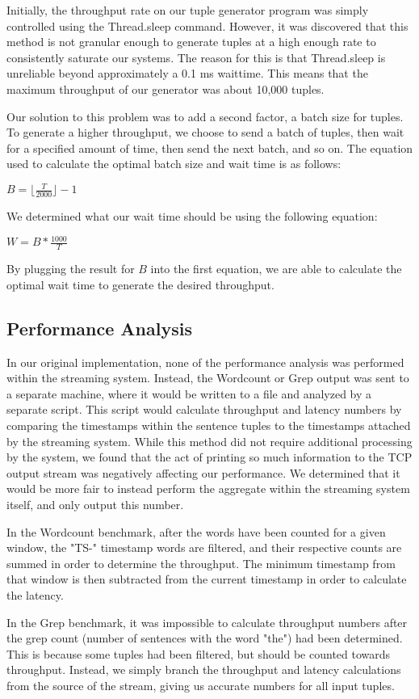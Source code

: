Initially, the throughput rate on our tuple generator program was simply controlled using the Thread.sleep command.  However, it was discovered that this method is not granular enough to generate tuples at a high enough rate to consistently saturate our systems.  The reason for this is that Thread.sleep is unreliable beyond approximately a 0.1 ms waittime.  This means that the maximum throughput of our generator was about 10,000 tuples.

Our solution to this problem was to add a second factor, a batch size for
tuples.  To generate a higher throughput, we choose to send a batch of tuples,
then wait for a specified amount of time, then send the next batch, and so on.
The equation used to calculate the optimal batch size and wait time is as follows:

{\large $B = \lfloor\frac{T}{2000}\rfloor - 1$}

We determined what our wait time should be using the following equation:

{\large $W = B * \frac{1000}{T}$}

By plugging the result for $B$ into the first equation, we are able to
calculate the optimal wait time to generate the desired throughput.

\subsection{Performance Analysis}
In our original implementation, none of the performance analysis was performed within the streaming system.  Instead, the Wordcount or Grep output was sent to a separate machine, where it would be written to a file and analyzed by a separate script.  This script would calculate throughput and latency numbers by comparing the timestamps within the sentence tuples to the timestamps attached by the streaming system.  While this method did not require additional processing by the system, we found that the act of printing so much information to the TCP output stream was negatively affecting our performance.  We determined that it would be more fair to instead perform the aggregate within the streaming system itself, and only output this number.

In the Wordcount benchmark, after the words have been counted for a given window, the "TS-" timestamp words are filtered, and their respective counts are summed in order to determine the throughput.  The minimum timestamp from that window is then subtracted from the current timestamp in order to calculate the latency.

In the Grep benchmark, it was impossible to calculate throughput numbers after the grep count (number of sentences with the word "the") had been determined.  This is because some tuples had been filtered, but should be counted towards throughput.  Instead, we simply branch the throughput and latency calculations from the source of the stream, giving us accurate numbers for all input tuples.
